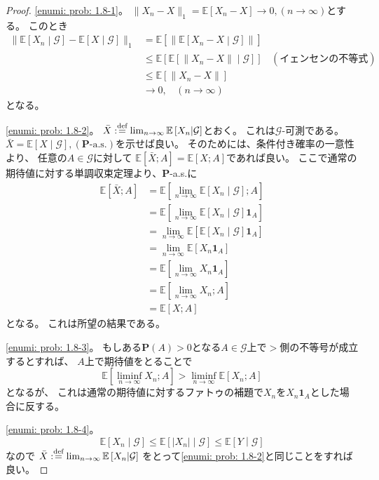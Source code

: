 \documentclass[uplatex]{jsarticle}
\theoremstyle{definition}
\def\P{\mathbf{P}}
\def\E{\mathbb{E}}
\def\I{\mathbf{1}}
\def\mcG{\mathcal{G}}
\def\dfn{:\overset{\mbox{{\scriptsize def}}}{=}}
\begin{document}
\begin{proof}
  \ref{enumi: prob: 1.8-1}。
  \(\| X_n-X\| _1 = \E\left[ X_n-X\right] \to 0 , (n\to \infty)\)とする。
  このとき
  \begin{align*}
    \| \E\left[X_n\middle|\mcG\right]-\E\left[X\middle|\mcG\right]\| _1
    &= \E\left[\|\E\left[X_n-X\middle|\mcG\right]\|\right] \\
    &\leq \E\left[\E\left[\|X_n-X\|\middle|\mcG\right]\right] \ \ \ \
    (\text{イェンセンの不等式}) \\
    &\leq \E\left[\|X_n-X\|\right] \\
    &\to 0 , \ \ \ \ (n\to \infty)
  \end{align*}
  となる。

  \ref{enumi: prob: 1.8-2}。
  \(\bar{X}\dfn \lim_{n\to \infty}\E\left[ X_n\middle|\mcG\right]\)とおく。
  これは\(\mcG\)-可測である。
  \(\bar{X} = \E\left[X\middle|\mcG\right], (\P\text{-a.s.})\)を示せば良い。
  そのためには、条件付き確率の一意性より、
  任意の\(A\in \mcG\)に対して
  \(\E\left[\bar{X};A\right] = \E\left[X;A\right]\)であれば良い。
  ここで通常の期待値に対する単調収束定理より、\(\P\)-a.s.に
  \begin{align*}
    \E\left[\bar{X};A\right]
    &= \E\left[\lim_{n\to \infty}\E\left[ X_n\middle|\mcG\right];A\right] \\
    &= \E\left[\lim_{n\to \infty}\E\left[ X_n\middle|\mcG\right]\I_A\right] \\
    &= \lim_{n\to \infty}\E\left[\E\left[ X_n\middle|\mcG\right]\I_A\right] \\
    &= \lim_{n\to \infty}\E\left[ X_n\I_A \right] \\
    &= \E\left[ \lim_{n\to \infty}X_n\I_A \right] \\
    &= \E\left[ \lim_{n\to \infty}X_n;A \right] \\
    &= \E\left[ X;A \right]
  \end{align*}
  となる。
  これは所望の結果である。

  \ref{enumi: prob: 1.8-3}。
  もしある\(\P(A)>0\)となる\(A\in \mcG\)上で\( > \)側の不等号が成立するとすれば、
  \(A\)上で期待値をとることで
  \[
  \E\left[\liminf_{n\to \infty} X_n ;A \right]
  > \liminf_{n\to \infty}\E \left[ X_n;A\right]
  \]
  となるが、
  これは通常の期待値に対するファトゥの補題で\(X_n\)を\(X_n\I_A\)とした場合に反する。

  \ref{enumi: prob: 1.8-4}。
  \[
  \E\left[ X_n\middle|\mcG\right]
  \leq \E\left[|X_n|\middle|\mcG\right]
  \leq \E\left[Y\middle|\mcG\right]
  \]
  なので
  \(\bar{X}\dfn \lim_{n\to \infty}\E\left[ X_n\middle|\mcG\right]\)
  をとって\ref{enumi: prob: 1.8-2}と同じことをすれば良い。
\end{proof}
\end{document}
